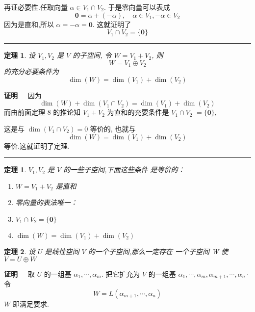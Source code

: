 \documentclass[13pt]{beamer}
\newtheorem{thm}{定理}
\newtheorem*{theo}{定理}
\def\qed{\nopagebreak\hfill{\rule{4pt}{7pt}}\medbreak}
\def\pf{{\bf 证明~~ }}
\def\dim{\operatorname{dim}}
\begin{document}
\begin{frame}
再证必要性.任取向量 ${\alpha} \in V_{1} \cap V_{2} .$ 于是零向量可以表成
\[
\mathbf{0}={\alpha}+(-{\alpha}), \quad {\alpha} \in V_{1},-{\alpha} \in V_{2}
\]
因为是直和,所以 ${\alpha}=-{\alpha}=\mathbf{0} .$ 这就证明了
\[
V_{1} \cap V_{2}=\{\mathbf{0}\}
\]
\qed
\end{frame}

\begin{frame}
\begin{thm}
设 $V_{1}, V_{2}$ 是 $V$ 的子空间, 令 $W=V_{1}+V_{2}$, 则
\[
W=V_{1} \oplus V_{2}
\]
的充分必要条件为
\[
\dim(W)=\dim \left(V_{1}\right)+\dim\left(V_{2}\right)
\]
\end{thm}
\pf  因为
\[
\dim(W)+\dim \left(V_{1} \cap V_{2}\right)=\dim \left(V_{1}\right)+\dim \left(V_{2}\right)
\]
而由前面定理 8 的推论知 $V_{1}+V_{2}$ 为直和的充要条件是 $V_{1} \cap V_{2}$
$=\{\mathbf{0}\},$ 

这是与 $\dim \left(V_{1} \cap V_{2}\right)=0$ 等价的, 也就与 $$\dim(W)=\dim\left(V_{1}\right)
+ \dim (V_2)$$等价.这就证明了定理. 
\qed
\end{frame}

\begin{frame}
\begin{theo}
$V_{1}, V_{2}$ 是 $V$ 的一些子空间,下面这些条件 是等价的：
\begin{enumerate}
	\item $W=V_{1}+V_{2}$ 是直和
	\item 零向量的表法唯一：
	\item $V_{1} \cap V_{2}=\{\mathbf{0}\}$
	\item $\dim(W)=\dim \left(V_{1}\right)+\dim\left(V_{2}\right)$
\end{enumerate}
\end{theo}
\end{frame}

\begin{frame}
\begin{thm}
	设 $U$ 是线性空间 $V$ 的一个子空间,那么一定存在
一个子空间 W 使 $V=U \oplus W$
\end{thm}
\pf 取 $U$ 的一组基 ${\alpha}_{1}, \cdots, {\alpha}_{m} .$ 把它扩充为 $V$ 的一组基
${\alpha}_{1}, \cdots, {\alpha}_{m}, {\alpha}_{m+1}, \cdots, {\alpha}_{n} \cdot$ 令
\[
W=L\left({\alpha}_{m+1}, \cdots, {\alpha}_{n}\right)
\]
$W$ 即满足要求.  
\end{frame}
\end{document}
